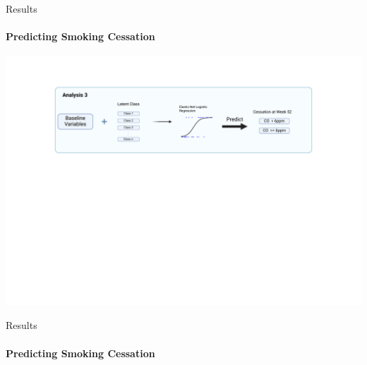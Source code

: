 \documentclass[aspectratio=169]{beamer}
\begin{document}
\begin{frame}{Results}
	\framesubtitle{Predicting Smoking Cessation}
	\includegraphics[width=\textwidth]{overview3}
\end{frame}

\begin{frame}{Results}
	\framesubtitle{Predicting Smoking Cessation}
		\begin{center}
			\scalebox{.7}{%
				
			}
	\end{center}
\end{frame}
\end{document}
